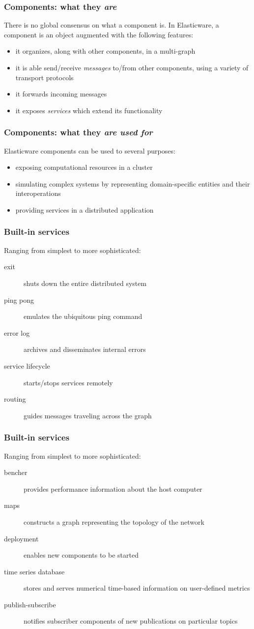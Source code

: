 \documentclass[11pt]{beamer}
\begin{document}
\begin{frame}
\frametitle{Components: what they \emph{are}}
There is no global consensus on what a component is. In Elasticware, a component is an object augmented with the following features:
\begin{itemize}
	\item it organizes, along with other components, in a multi-graph
	\item it is able send/receive \emph{messages} to/from other components, using a variety of transport protocols
	\item it forwards incoming messages
	\item it exposes \emph{services} which extend its  functionality
\end{itemize}
\end{frame}


\begin{frame}
\frametitle{Components: what they \emph{are used for}}
Elasticware components can be used to several purposes:
\begin{itemize}
	\item exposing computational resources in a cluster
	\item simulating complex systems by representing domain-specific entities and their interoperations
	\item providing services in a distributed application
\end{itemize}
\end{frame}


\begin{frame}
\frametitle{Built-in services}
Ranging from simplest to more sophisticated:
\begin{description}
	\item[exit] shuts down the entire distributed system
	\item[ping pong] emulates the ubiquitous ping command
	\item[error log] archives and disseminates internal errors
	\item[service lifecycle] starts/stops services remotely
	\item[routing] guides messages traveling across the  graph
\end{description}
\end{frame}


\begin{frame}
\frametitle{Built-in services}
Ranging from simplest to more sophisticated:
\begin{description}
	\item[bencher] provides performance information about the host computer
	\item[maps]  constructs a graph representing the topology of the network
	\item[deployment] enables new components to be started 
	\item[time series database] stores and serves numerical time-based information on user-defined metrics
	\item[publish-subscribe] notifies subscriber components of new publications on particular topics
\end{description}
\end{frame}
\end{document}
